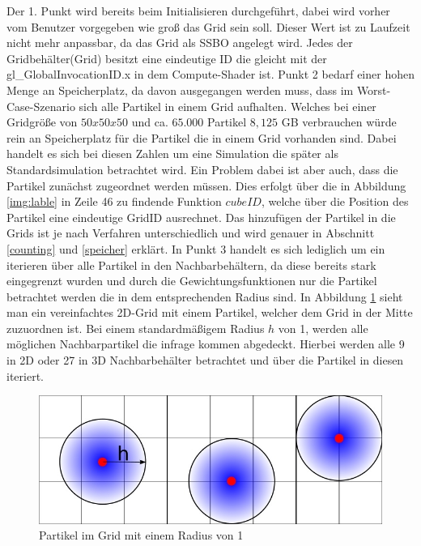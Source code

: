 \documentclass[intern,palatino]{cgBA}
\begin{document}
Der 1. Punkt wird bereits beim Initialisieren durchgeführt, dabei wird vorher vom Benutzer vorgegeben wie groß das Grid sein soll. Dieser Wert ist zu Laufzeit nicht mehr anpassbar, da das Grid als SSBO angelegt wird. Jedes der Gridbehälter(Grid) besitzt eine eindeutige ID die gleicht mit der gl\_GlobalInvocationID.x in dem Compute-Shader ist. 
\newline
Punkt 2 bedarf einer hohen Menge an Speicherplatz, da davon ausgegangen werden muss, dass im Worst-Case-Szenario sich alle Partikel in einem Grid aufhalten. Welches bei einer Gridgröße von $50x50x50$ und ca. $65.000$ Partikel $8,125$ GB verbrauchen würde rein an Speicherplatz für die Partikel die in einem Grid vorhanden sind. Dabei handelt es sich bei diesen Zahlen um eine Simulation die später als Standardsimulation betrachtet wird.
\newline
Ein Problem dabei ist aber auch, dass die Partikel zunächst zugeordnet werden müssen. Dies erfolgt über die in Abbildung \ref{img:lable} in Zeile 46 zu findende Funktion $cubeID$, welche über die Position des Partikel eine eindeutige GridID ausrechnet. Das hinzufügen der Partikel in die Grids ist je nach Verfahren unterschiedlich und wird genauer in Abschnitt \ref{counting} und \ref{speicher}  erklärt.
\newline
In Punkt 3 handelt es sich lediglich um ein iterieren über alle Partikel in den Nachbarbehältern, da diese bereits stark eingegrenzt wurden und durch die Gewichtungsfunktionen nur die Partikel betrachtet werden die in dem entsprechenden Radius sind.
\newline
In Abbildung \ref{img:grid} sieht man ein vereinfachtes 2D-Grid mit einem Partikel, welcher dem Grid in der Mitte zuzuordnen ist. Bei einem standardmäßigem Radius $h$ von 1, werden alle möglichen Nachbarpartikel die infrage kommen abgedeckt. Hierbei werden alle 9 in 2D oder 27 in 3D Nachbarbehälter betrachtet und über die Partikel in diesen iteriert.

\begin{figure}[H]
	\centering
	\includegraphics[width=1\columnwidth]{Bilder/grid.jpg}
	\caption{Partikel im Grid mit einem Radius von 1}
	\label{img:grid}
\end{figure}
\end{document}
